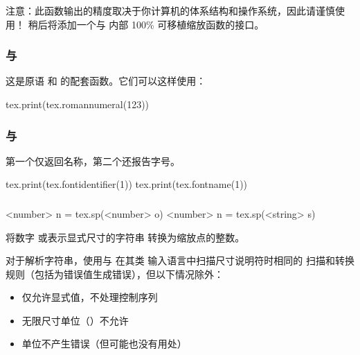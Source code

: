 注意：此函数输出的精度取决于你计算机的体系结构和操作系统，因此请谨慎使用！
稍后将添加一个与 \LUATEX 内部 100\% 可移植缩放函数的接口。

\subsubsection{ 与 }


这是原语  和  的配套函数。它们可以这样使用：

\begin{typing}
tex.print(tex.romannumeral(123))
\end{typing}

\subsubsection{ 与 }


第一个仅返回名称，第二个还报告字号。

\begin{typing}
tex.print(tex.fontidentifier(1))
tex.print(tex.fontname(1))
\end{typing}

\subsubsection{}


\begin{typing}
<number> n = tex.sp(<number> o)
<number> n = tex.sp(<string> s)
\end{typing}

将数字  或表示显式尺寸的字符串  转换为缩放点的整数。

对于解析字符串，使用与 \LUATEX 在其类 \TEX 输入语言中扫描尺寸说明符时相同的
扫描和转换规则（包括为错误值生成错误），但以下情况除外：

\begin{itemize}
\item 仅允许显式值，不处理控制序列

\item 无限尺寸单位（）不允许

\item {} 单位不产生错误（但可能也没有用处）

\end{itemize}

